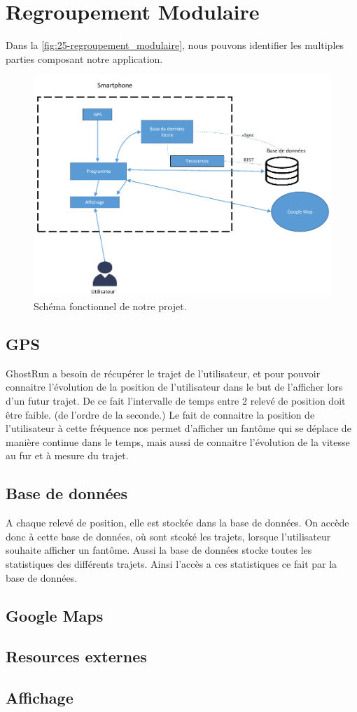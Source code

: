 \chapter{Regroupement Modulaire}

Dans la \autoref{fig:25-regroupement_modulaire}, nous pouvons identifier les multiples parties composant notre application.

\begin{figure}[h]
    \centering
    \includegraphics[keepaspectratio, width=2\textwidth/2, height=2\textheight/5]{ima/regroupement_modulaire}
    \caption{Schéma fonctionnel de notre projet.}
    \label{fig:25-regroupement_modulaire}
\end{figure}

\section{GPS}
GhostRun a besoin de récupérer le trajet de l'utilisateur, et pour pouvoir connaitre l'évolution de la position de l'utilisateur
dans le but de l'afficher lors d'un futur trajet. De ce fait l'intervalle de temps entre 2 relevé de position doit être faible.
(de l'ordre de la seconde.)
Le fait de connaitre la position de l'utilisateur à cette fréquence nos permet d'afficher un fantôme qui se déplace de manière continue dans le temps,
mais aussi de connaitre l'évolution de la vitesse au fur et à mesure du trajet.

\section{Base de données}
A chaque relevé de position, elle est stockée dans la base de données. On accède donc à cette base de données, où sont stcoké les trajets,
lorsque l'utilisateur souhaite afficher un fantôme.
Aussi la base de données stocke toutes les statistiques des différents trajets. Ainsi l'accès a ces statistiques ce fait par la base de données.
\section{Google Maps}

\section{Resources externes}

\section{Affichage}
